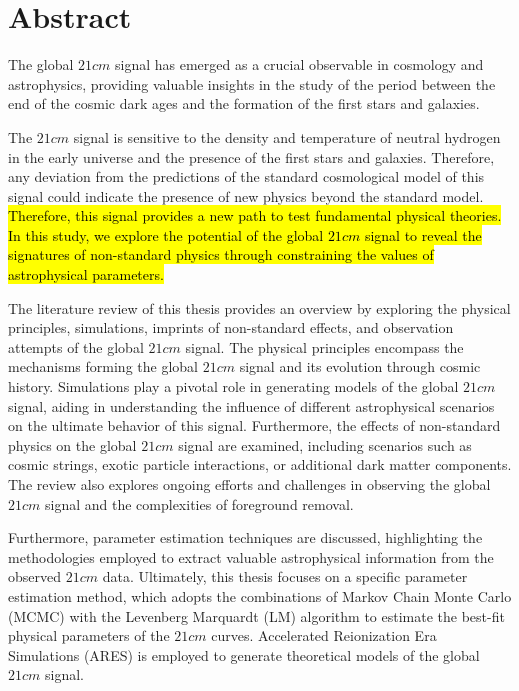 \documentclass[12pt, TexShade, letterpaper]{report}
\begin{document}
\chapter*{Abstract}
	\label{chap:engAbstract}
The global $21cm$ signal has emerged as a crucial observable in cosmology and astrophysics, providing valuable insights in the study of the period between the end of the cosmic dark ages and the formation of the first stars and galaxies.\par

The $21cm$ signal is sensitive to the density and temperature of neutral hydrogen in the early universe and the presence of the first stars and galaxies. Therefore, any deviation from the predictions of the standard cosmological model of this signal could indicate the presence of new physics beyond the standard model. \hl{Therefore, this signal provides a new path to test fundamental physical theories.
In this study, we explore the potential of the global $21cm$ signal to reveal the signatures of non-standard physics through constraining the values of astrophysical parameters.}\par

The literature review of this thesis provides an overview by exploring the physical principles, simulations, imprints of non-standard effects, and observation attempts of the global $21cm$ signal. The physical principles encompass the mechanisms forming the global $21cm$ signal and its evolution through cosmic history. Simulations play a pivotal role in generating models of the global $21cm$ signal, aiding in understanding the influence of different astrophysical scenarios on the ultimate behavior of this signal. Furthermore, the effects of non-standard physics on the global $21cm$ signal are examined, including scenarios such as cosmic strings, exotic particle interactions, or additional dark matter components. The review also explores ongoing efforts and challenges in observing the global $21cm$ signal and the complexities of foreground removal.\par

Furthermore, parameter estimation techniques are discussed, highlighting the methodologies employed to extract valuable astrophysical information from the observed $21cm$ data. Ultimately, this thesis focuses on a specific parameter estimation method, which adopts the combinations of Markov Chain Monte Carlo (MCMC) with the Levenberg Marquardt (LM) algorithm to estimate the best-fit physical parameters of the $21cm$ curves. Accelerated Reionization Era Simulations (ARES) is employed to generate theoretical models of the global $21cm$ signal.\par
\end{document}
